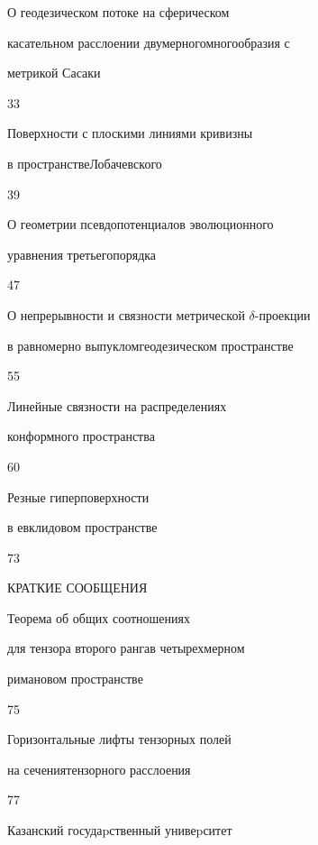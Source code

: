 

{О геодезическом потоке на сферическом  


касательном расслоении двумерного\newline многообразия с  


метрикой Сасаки}{33}




{Поверхности с плоскими линиями кривизны


в пространстве\newline Лобачевского}{39}




{О геометрии псевдопотенциалов эволюционного


уравнения третьего\newline порядка}{47}




{О непрерывности и связности метрической $\delta$-проекции


в равномерно выпуклом\newline геодезическом пространстве}{55}




{Линейные связности на распределениях  


конформного пространства}{60}




{Резные гиперповерхности


в евклидовом пространстве}{73}





\bigskip





\bigskip


\par


\centerline{КРАТКИЕ СООБЩЕНИЯ}


\bigskip







{Теорема об общих соотношениях


для тензора второго ранга\newline в четырехмерном


римановом пространстве}{75}




{Горизонтальные лифты тензорных полей


на сечения\newline тензорного расслоения}{77}











\vfill


\noindent\raisebox{2pt}{\copyright} Казанский госудаpственный унивеpситет





